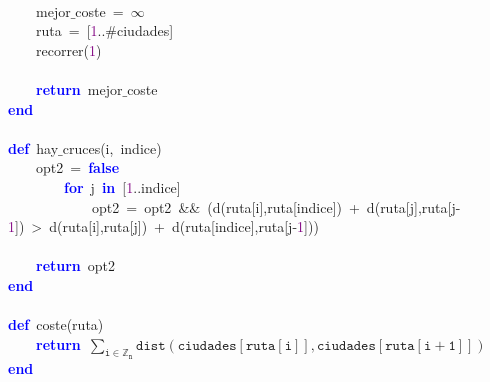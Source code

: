 \mbox{} \\
\mbox{}\ \ \ \ mejor$\_$coste\ \textcolor{BrickRed}{=}\ $\infty$ \\
\mbox{}\ \ \ \ ruta\ \textcolor{BrickRed}{=}\ \textcolor{BrickRed}{[}\textcolor{Purple}{1}\textcolor{BrickRed}{..}\#ciudades\textcolor{BrickRed}{]} \\
\mbox{}\ \ \ \ recorrer\textcolor{BrickRed}{(}\textcolor{Purple}{1}\textcolor{BrickRed}{)} \\
\mbox{} \\
\mbox{}\ \ \ \ \textbf{\textcolor{Blue}{return}}\ mejor$\_$coste \\
\mbox{}\textbf{\textcolor{Blue}{end}} \\
\mbox{} \\
\mbox{}\textbf{\textcolor{Blue}{def}}\ hay$\_$cruces\textcolor{BrickRed}{(}i\textcolor{BrickRed}{,}\ indice\textcolor{BrickRed}{)} \\
\mbox{}\ \ \ \ opt2\ \textcolor{BrickRed}{=}\ \textbf{\textcolor{Blue}{false}} \\
\mbox{}\ \ \ \ \ \ \ \ \textbf{\textcolor{Blue}{for}}\ j\ \textbf{\textcolor{Blue}{in}}\ \textcolor{BrickRed}{[}\textcolor{Purple}{1}\textcolor{BrickRed}{..}indice\textcolor{BrickRed}{]} \\
\mbox{}\ \ \ \ \ \ \ \ \ \ \ \ opt2\ \textcolor{BrickRed}{=}\ opt2\ \textcolor{BrickRed}{\&\&}\ \textcolor{BrickRed}{(}d\textcolor{BrickRed}{(}ruta\textcolor{BrickRed}{[}i\textcolor{BrickRed}{],}ruta\textcolor{BrickRed}{[}indice\textcolor{BrickRed}{])}\ \textcolor{BrickRed}{+}\ d\textcolor{BrickRed}{(}ruta\textcolor{BrickRed}{[}j\textcolor{BrickRed}{],}ruta\textcolor{BrickRed}{[}j\textcolor{BrickRed}{-}\textcolor{Purple}{1}\textcolor{BrickRed}{])}\ \textcolor{BrickRed}{\textgreater{}}\ d\textcolor{BrickRed}{(}ruta\textcolor{BrickRed}{[}i\textcolor{BrickRed}{],}ruta\textcolor{BrickRed}{[}j\textcolor{BrickRed}{])}\ \textcolor{BrickRed}{+}\ d\textcolor{BrickRed}{(}ruta\textcolor{BrickRed}{[}indice\textcolor{BrickRed}{],}ruta\textcolor{BrickRed}{[}j\textcolor{BrickRed}{-}\textcolor{Purple}{1}\textcolor{BrickRed}{]))} \\
\mbox{} \\
\mbox{}\ \ \ \ \textbf{\textcolor{Blue}{return}}\ opt2 \\
\mbox{}\textbf{\textcolor{Blue}{end}} \\
\mbox{} \\
\mbox{}\textbf{\textcolor{Blue}{def}}\ coste\textcolor{BrickRed}{(}ruta\textcolor{BrickRed}{)} \\
\mbox{}\ \ \ \ \textbf{\textcolor{Blue}{return}}\ $\mathtt{\sum_{i \in \mathbb{Z}_n} dist(ciudades[ruta[i]], ciudades[ruta[i+1]])}$\\
\mbox{}\textbf{\textcolor{Blue}{end}} \\
\mbox{}
